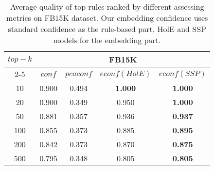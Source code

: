 \begin{table}[tbh]
\centering
\begin{tabular}{|c|c|c|c|c|} 
 \hline
 \multirow{3}{*}{$top-k$} & \multicolumn{4}{|c|}{FB15K} \\
\cline{2-5}
 & $conf$ & $pcaconf$ & $econf(HolE)$ & $econf(SSP)$ \\
 \hline
10 & 0.900 & 0.494 & \textbf{1.000} & \textbf{1.000} \\
20 & 0.900 & 0.349 & 0.950 & \textbf{1.000} \\
50 & 0.881 & 0.357 & 0.936 & \textbf{0.937} \\
100 & 0.855 & 0.373 & 0.885 & \textbf{0.895} \\
200 & 0.842 & 0.373 & 0.870 & \textbf{0.875} \\
500 & 0.795 & 0.348 & 0.805 & \textbf{0.805} \\
 \hline
\end{tabular}
\newline
\caption{Average quality of top rules ranked by different assessing metrics on FB15K dataset. Our embedding confidence uses standard confidence as the rule-based part, HolE and SSP models for the embedding part.}
\label{table:fb15k_quality}
\end{table}
